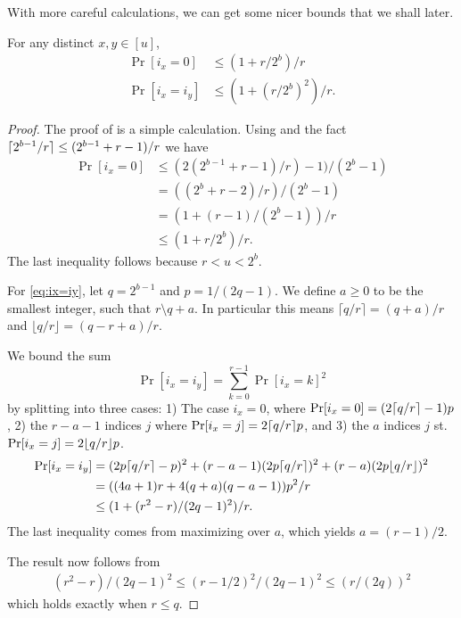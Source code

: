 With
more careful calculations, we can get some nicer bounds
that we shall later.
\begin{lemma}\label{lem:ix-r-dist} For any distinct $x,y\in [u]$, 
   \begin{align}
      \Pr[i_x=0]&\le(1+r/2^b)/r\label{eq:ix=0}\\
      \Pr[i_x=i_y]&\leq \left(1+(r/2^b)^2\right)/r.\label{eq:ix=iy}
   \end{align}
\end{lemma}
\begin{proof}
   The proof of  is a simple calculation.
   Using  and the fact $\lceil {2^{b-1}/r}\rceil\le(2^{b-1}+r-1)/r$ we have
   \begin{align*}
      \Pr[i_x=0]&\le (2(2^{b-1}+r-1)/r)-1)/(2^{b}-1)\\
                &=((2^b+r-2)/r)/(2^b-1)\\
                &=\left(1+(r-1)/(2^b-1)\right)/r\\
                &\le\left(1+r/2^b\right)/r.
   \end{align*}
   The last inequality follows because $r<u<2^b$.

   For \ref{eq:ix=iy},
   let $q=2^{b-1}$ and $p=1/(2q-1)$.
   We define $a\ge 0$ to be the smallest integer, such that $r\setminus q+a$.
   In particular this means 
   $\lceil q/r\rceil = (q+a)/r$ and
   $\lfloor q/r\rfloor = (q-r+a)/r$.

   We bound the sum
   $$
   \Pr[i_x=i_y]
   = \sum_{k=0}^{r-1} \Pr[i_x = k]^2
   $$
   by splitting into three cases:
   1) The case $i_x=0$, where $\Pr[i_x=0]=(2\lceil {q/r}\rceil-1)p$,
   2) the $r-a-1$ indices $j$ where $\Pr[i_x=j]=2\lceil {q/r}\rceil p$,
   and 3) the $a$ indices $j$ st. $\Pr[i_x=j]=2\lfloor {q/r} \rfloor p$.
   \begin{align*}
      \Pr[i_x=i_y]
   &=
   (2p\lceil { q/r}\rceil-p)^2 + (r-a-1) (2p \lceil q/r\rceil)^2 + (r-a) (2p \lfloor q/r \rfloor)^2
 \\&= ((4a+1)r+4(q+a)(q-a-1))p^2/r
 \\&\le (1 + (r^2-r)/(2q-1)^2) / r.
   \end{align*}
   The last inequality comes from maximizing over $a$, which yields $a=(r-1)/2$.

   The result now follows from
   \begin{align}
      (r^2-r)/(2q-1)^2
      \le
      (r-1/2)^2/(2q-1)^2
      \le
      (r/(2q))^2
   \end{align}
   which holds exactly when $r\le q$.



\end{proof}
